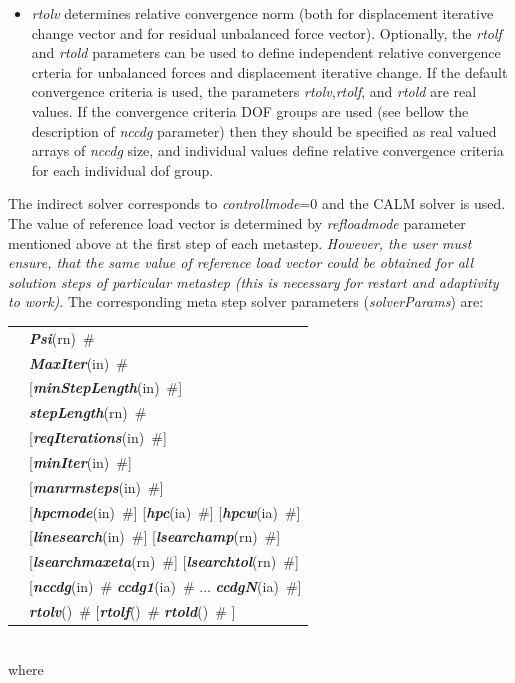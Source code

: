 \documentclass[a4paper]{article}
\makeatletter
\newcommand{\param}[1]{{\em #1}}
\newcommand{\keywordnotype}[1]{\mbox{{\it{\bf{#1}}}}}
\newcommand{\keyword}[2]{\mbox{{\keywordnotype{#1}\tiny (#2)}}}
\newcommand{\field}[2]{\mbox{\keyword{#1}{#2}~\#}}
\newcommand{\optField}[2]{\mbox{[\field{#1}{#2}]}}
\newenvironment{record}[1][]{\begin{tabular}{|ll}}{\end{tabular}\\}
\newcommand{\recentry}[2]{{#1}&{#2}\\}
\newcounter{rcc}
\newenvironment{record}[1][\textwidth]{\setcounter{rcc}{0}\begin{tabular*}{#1}{|ll@{\extracolsep{\fill}}r}}{\end{tabular*}\\}
\newcommand{\recentry}[2]{\ifthenelse{\value{rcc}>0}{&$\backslash$ \\}{\setcounter{rcc}{1}}{#1}&{#2}}
\makeatother
\begin{document}
\begin{itemize}
\item \param{rtolv} determines relative convergence norm (both for displacement
iterative change vector and for residual unbalanced force vector). Optionally, the \param{rtolf} and \param{rtold} parameters can be used to define
independent relative convergence crteria for unbalanced forces and displacement
iterative change. If the default convergence criteria is used,
the parameters \param{rtolv},\param{rtolf}, and \param{rtold} are real values. If the convergence criteria DOF groups are used (see bellow the description of \param{nccdg} parameter) then they should be specified as real valued arrays of \param{nccdg} size, and individual values define relative convergence criteria for each individual dof group.
\end{itemize}

The indirect solver corresponds to \param{controllmode}=0 and the CALM
solver is used. The value of reference load vector is determined by
\param{refloadmode} parameter mentioned above at the first step of
each metastep. {\em However, the user must ensure, that the same value of
reference load vector could be obtained for all solution steps of
particular metastep (this is necessary for restart and adaptivity to work)}.
The corresponding meta step solver parameters (\param{solverParams}) are:\\
\begin{record}
\recentry{\hspace{10mm}}{\field{Psi}{rn}}
\recentry{}{\field{MaxIter}{in}}
\recentry{}{\optField{min\-Step\-Le\-ngth}{in}}
\recentry{}{\field{stepLength}{rn}}
\recentry{}{\optField{reqIterations}{in}}
\recentry{}{\optField{minIter}{in}}
\recentry{}{\optField{manrmsteps}{in}}
\recentry{}{\optField{hpcmode}{in} \optField{hpc}{ia} \optField{hpcw}{ia}}
\recentry{}{\optField{linesearch}{in} \optField{lsearchamp}{rn}}
\recentry{}{\optField{lsearchmaxeta}{rn} \optField{lsearchtol}{rn}}
\recentry{}{[\field{nccdg}{in} \field{ccdg1}{ia} ... \field{ccdgN}{ia}]}
\recentry{}{\field{rtolv}{} [\field{rtolf}{} \field{rtold}{} ]}
\end{record}
where
\end{document}
